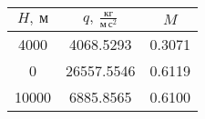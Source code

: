 \begin{tabular}{|c|c|c|}
\hline
 $H,\ м$ &  $q,\ \frac{кг}{м\,с^2}$ &    $M$ \\
\hline
    4000 &                4068.5293 & 0.3071 \\
       0 &               26557.5546 & 0.6119 \\
   10000 &                6885.8565 & 0.6100 \\
\hline
\end{tabular}
